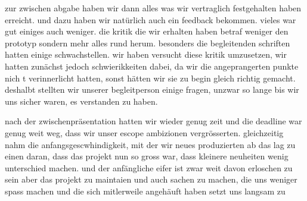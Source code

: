 \documentclass[../Main.tex]{subfiles}
\begin{document}
zur zwischen abgabe haben wir dann alles was wir vertraglich festgehalten haben erreicht. und dazu haben wir natürlich auch ein feedback bekommen. vieles war gut einiges auch weniger. die kritik die wir erhalten haben betraf weniger den prototyp sondern mehr alles rund herum. besonders die begleitenden schriften hatten einige schwachstellen. wir haben versucht diese kritik umzusetzen, wir hatten zunächst jedoch schwierikkeiten dabei, da wir die angeprangerten punkte nich t verinnerlicht hatten, sonst hätten wir sie zu begin gleich richtig gemacht. deshalbt stellten wir unserer begleitperson einige fragen, unzwar so lange bis wir uns sicher waren, es verstanden zu haben.

nach der zwischenpräsentation hatten wir wieder genug zeit und die deadline war genug weit weg, dass wir unser escope ambizionen vergrösserten. gleichzeitig nahm die anfangsgescwhindigkeit, mit der wir neues produzierten ab das lag zu einen daran, dass das projekt nun so gross war, dass kleinere neuheiten wenig unterschied machen. und der anfängliche eifer ist zwar weit davon erloschen zu sein aber das projekt zu maintaien und auch sachen zu machen, die uns weniger spass machen und die sich mitlerweile angehäuft haben setzt uns langsam zu
\end{document}
